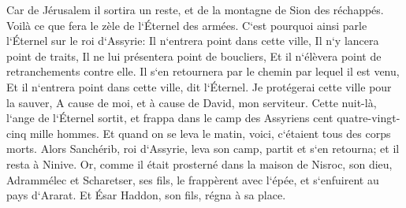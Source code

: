 \verse Car de Jérusalem il sortira un reste, et de la montagne de Sion des réchappés. Voilà ce que fera le zèle de l`Éternel des armées. 
\verse C`est pourquoi ainsi parle l`Éternel sur le roi d`Assyrie: Il n`entrera point dans cette ville, Il n`y lancera point de traits, Il ne lui présentera point de boucliers, Et il n`élèvera point de retranchements contre elle. 
\verse Il s`en retournera par le chemin par lequel il est venu, Et il n`entrera point dans cette ville, dit l`Éternel. 
\verse Je protégerai cette ville pour la sauver, A cause de moi, et à cause de David, mon serviteur. 
\verse Cette nuit-là, l`ange de l`Éternel sortit, et frappa dans le camp des Assyriens cent quatre-vingt-cinq mille hommes. Et quand on se leva le matin, voici, c`étaient tous des corps morts. 
\verse Alors Sanchérib, roi d`Assyrie, leva son camp, partit et s`en retourna; et il resta à Ninive. 
\verse Or, comme il était prosterné dans la maison de Nisroc, son dieu, Adrammélec et Scharetser, ses fils, le frappèrent avec l`épée, et s`enfuirent au pays d`Ararat. Et Ésar Haddon, son fils, régna à sa place. 

